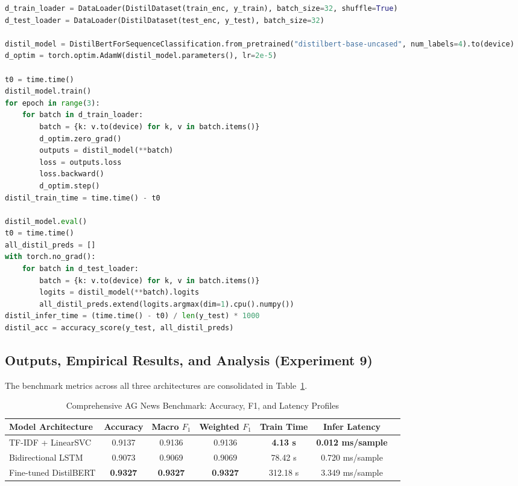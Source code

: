 \begin{lstlisting}[language=Python, caption={Complete Implementation of Experiment 9: AG News Topic Classification}, label={lst:exp9_code}]
d_train_loader = DataLoader(DistilDataset(train_enc, y_train), batch_size=32, shuffle=True)
d_test_loader = DataLoader(DistilDataset(test_enc, y_test), batch_size=32)

distil_model = DistilBertForSequenceClassification.from_pretrained("distilbert-base-uncased", num_labels=4).to(device)
d_optim = torch.optim.AdamW(distil_model.parameters(), lr=2e-5)

t0 = time.time()
distil_model.train()
for epoch in range(3):
    for batch in d_train_loader:
        batch = {k: v.to(device) for k, v in batch.items()}
        d_optim.zero_grad()
        outputs = distil_model(**batch)
        loss = outputs.loss
        loss.backward()
        d_optim.step()
distil_train_time = time.time() - t0

distil_model.eval()
t0 = time.time()
all_distil_preds = []
with torch.no_grad():
    for batch in d_test_loader:
        batch = {k: v.to(device) for k, v in batch.items()}
        logits = distil_model(**batch).logits
        all_distil_preds.extend(logits.argmax(dim=1).cpu().numpy())
distil_infer_time = (time.time() - t0) / len(y_test) * 1000
distil_acc = accuracy_score(y_test, all_distil_preds)
\end{lstlisting}

\subsection{Outputs, Empirical Results, and Analysis (Experiment 9)}
The benchmark metrics across all three architectures are consolidated in Table~\ref{tab:exp9_benchmark_results}.

\begin{table}[H]
\centering
\caption{Comprehensive AG News Benchmark: Accuracy, F1, and Latency Profiles}
\label{tab:exp9_benchmark_results}
\begin{tabular}{lcccccc}
\toprule
\textbf{Model Architecture} & \textbf{Accuracy} & \textbf{Macro $F_1$} & \textbf{Weighted $F_1$} & \textbf{Train Time} & \textbf{Infer Latency} \\
\midrule
TF-IDF + LinearSVC & 0.9137 & 0.9136 & 0.9136 & \textbf{4.13 s} & \textbf{0.012 ms/sample} \\
Bidirectional LSTM & 0.9073 & 0.9069 & 0.9069 & 78.42 s & 0.720 ms/sample \\
Fine-tuned DistilBERT & \textbf{0.9327} & \textbf{0.9327} & \textbf{0.9327} & 312.18 s & 3.349 ms/sample \\
\bottomrule
\end{tabular}
\end{table}

